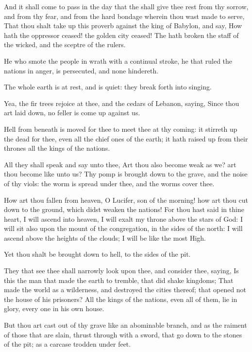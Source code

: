 \verse And it shall come to pass in the day that the \LORD shall give thee rest from thy sorrow, and from thy fear, and from the hard bondage wherein thou wast made to serve, \verse That thou shalt take up this proverb against the king of Babylon, and say, How hath the oppressor ceased! the golden city ceased!  \verse The \LORD hath broken the staff of the wicked, and the sceptre of the rulers.

\verse He who smote the people in wrath with a continual stroke, he that ruled the nations in anger, is persecuted, and none hindereth.

\verse The whole earth is at rest, and is quiet: they break forth into singing.

\verse Yea, the fir trees rejoice at thee, and the cedars of Lebanon, saying, Since thou art laid down, no feller is come up against us.

\verse Hell from beneath is moved for thee to meet thee at thy coming: it stirreth up the dead for thee, even all the chief ones of the earth; it hath raised up from their thrones all the kings of the nations.

\verse All they shall speak and say unto thee, Art thou also become weak as we? art thou become like unto us?  \verse Thy pomp is brought down to the grave, and the noise of thy viols: the worm is spread under thee, and the worms cover thee.

\verse How art thou fallen from heaven, O Lucifer, son of the morning!  how art thou cut down to the ground, which didst weaken the nations!  \verse For thou hast said in thine heart, I will ascend into heaven, I will exalt my throne above the stars of God: I will sit also upon the mount of the congregation, in the sides of the north: \verse I will ascend above the heights of the clouds; I will be like the most High.

\verse Yet thou shalt be brought down to hell, to the sides of the pit.

\verse They that see thee shall narrowly look upon thee, and consider thee, saying, Is this the man that made the earth to tremble, that did shake kingdoms; \verse That made the world as a wilderness, and destroyed the cities thereof; that opened not the house of his prisoners?  \verse All the kings of the nations, even all of them, lie in glory, every one in his own house.

\verse But thou art cast out of thy grave like an abominable branch, and as the raiment of those that are slain, thrust through with a sword, that go down to the stones of the pit; as a carcase trodden under feet.

